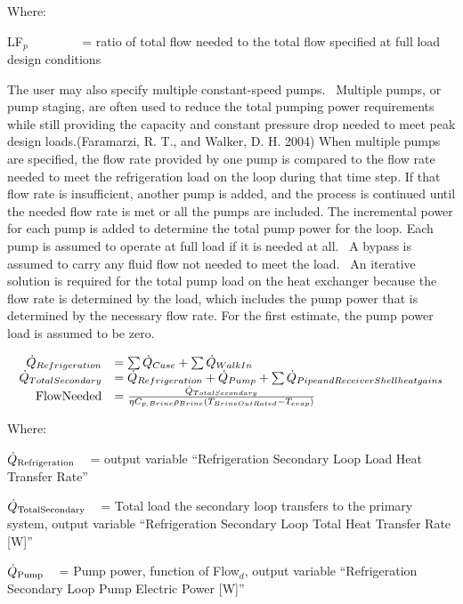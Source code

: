 Where:

LF\(_{p}\)~~~~~~~~ = ratio of total flow needed to the total flow specified at full load design conditions

The user may also specify multiple constant-speed pumps.~ Multiple pumps, or pump staging, are often used to reduce the total pumping power requirements while still providing the capacity and constant pressure drop needed to meet peak design loads.(Faramarzi, R. T., and Walker, D. H. 2004) When multiple pumps are specified, the flow rate provided by one pump is compared to the flow rate needed to meet the refrigeration load on the loop during that time step. If that flow rate is insufficient, another pump is added, and the process is continued until the needed flow rate is met or all the pumps are included. The incremental power for each pump is added to determine the total pump power for the loop. Each pump is assumed to operate at full load if it is needed at all.~ A bypass is assumed to carry any fluid flow not needed to meet the load.~ An iterative solution is required for the total pump load on the heat exchanger because the flow rate is determined by the load, which includes the pump power that is determined by the necessary flow rate. For the first estimate, the pump power load is assumed to be zero.

\begin{equation}
  \begin{array}{rl}
    \dot{Q}_{Refrigeration} &= \sum \dot{Q}_{Case} + \sum \dot{Q}_{WalkIn} \\
    \dot{Q}_{TotalSecondary} &= \dot{Q}_{Refrigeration} + \dot{Q}_{Pump} + \sum \dot{Q}_{Pipe and Receiver Shell heat gains} \\
    \text{FlowNeeded} &= \frac{\dot{Q}_{TotalSecondary}}{\eta C_{p,Brine} \rho_{Brine}\PB{T_{BrineOutRated} - T_{evap}}}
  \end{array}
\end{equation}

Where:

\({\dot Q_{{\rm{Refrigeration}}}}\) ~ = output variable ``Refrigeration Secondary Loop Load Heat Transfer Rate''

\({\dot Q_{{\rm{TotalSecondary}}}}\) ~ = Total load the secondary loop transfers to the primary system, output variable ``Refrigeration Secondary Loop Total Heat Transfer Rate {[}W{]}''

\({\dot Q_{{\rm{Pump}}}}\) ~ = Pump power, function of Flow\(_{d}\), output variable ``Refrigeration Secondary Loop Pump Electric Power {[}W{]}''

